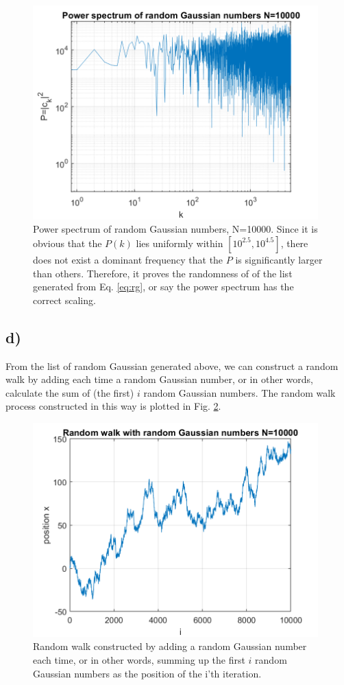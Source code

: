 \documentclass[12pt, graphicx]{article}
\begin{document}
\begin{figure}[ht]
\centering
\includegraphics[width = 110mm]{psg.png}
\caption{Power spectrum of random Gaussian numbers, N=10000. Since it is obvious that the $P(k)$ lies uniformly within $[10^{2.5},10^{4.5}]$, there does not exist a dominant frequency that the $P$ is significantly larger than others. Therefore, it proves the randomness of of the list generated from Eq. \ref{eq:rg}, or say the power spectrum has the correct scaling.}
\label{fig:psg}
\end{figure}


\subsection*{d)}
From the list of random Gaussian generated above, we can construct a random walk by adding each time a random Gaussian number, or in other words, calculate the sum of (the first) $i$ random Gaussian numbers. The random walk process constructed in this way is plotted in Fig. \ref{fig:rw}.

\begin{figure}[ht]
\centering
\includegraphics[width = 110mm]{rw.png}
\caption{Random walk constructed by adding a random Gaussian number each time, or in other words, summing up the first $i$ random Gaussian numbers as the position of the i'th iteration.}
\label{fig:rw}
\end{figure}
\end{document}
